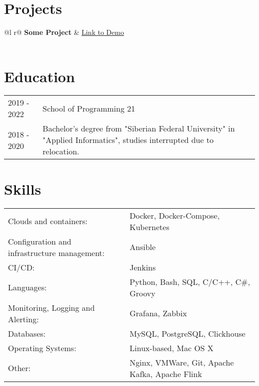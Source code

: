 \documentclass[a4paper,12pt]{article}
\begin{document}
    \section{Projects}

    \begin{tabularx}{\linewidth}{ @{}l r@{} }
        \textbf{Some Project} & \hfill \href{https://some-link.com}{Link to Demo} \\[3.75pt]
          \\
    \end{tabularx}

    \section{Education}
    \begin{tabularx}{\linewidth}{@{}l X@{}}
        2019 - 2022 & School of Programming 21 \hfill \normalsize \\

        2018 - 2020 & Bachelor's degree from "Siberian Federal University" in "Applied Informatics", studies interrupted due to relocation. \hfill \\
    \end{tabularx}

    \section{Skills}
    \begin{tabularx}{\linewidth}{@{}l X@{}}
        Clouds and containers:  &  \normalsize{Docker, Docker-Compose, Kubernetes}\\
        Configuration and infrastructure management:  &  \normalsize{Ansible}\\
        CI/CD:  &  \normalsize{Jenkins}\\
        Languages:  &  \normalsize{Python, Bash, SQL, C/C++, C\#, Groovy}\\
        Monitoring, Logging and Alerting:  &  \normalsize{Grafana, Zabbix}\\
        Databases:  &  \normalsize{MySQL, PostgreSQL, Clickhouse}\\
        Operating Systems:  &  \normalsize{Linux-based, Mac OS X}\\
        Other:  &  \normalsize{Nginx, VMWare, Git, Apache Kafka, Apache Flink}\\
    \end{tabularx}
\end{document}

